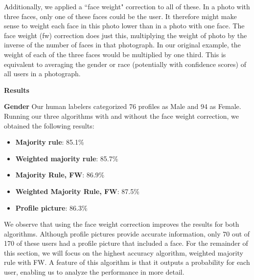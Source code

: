 Additionally, we applied a ``face weight" correction to all of these.
In a photo with three faces, only one of these faces could be the user.
It therefore might make sense to weight each face in this photo lower than in a photo with one face.
The face weight (fw) correction does just this, multiplying the weight of photo by the inverse of the number of faces in that photograph.
In our original example, the weight of each of the three faces would be multiplied by one third.
This is equivalent to averaging the gender or race (potentially with confidence scores) of all users in a photograph.


\textbf{Results}

\textbf{Gender}
Our human labelers categorized 76 profiles as Male and 94 as Female.
Running our three algorithms with and without the face weight correction, we obtained the following results:
\begin{itemize}
\item \textbf{Majority rule}: 85.1\%
\item \textbf{Weighted majority rule}: 85.7\%
\item \textbf{Majority Rule, FW}: 86.9\%
\item \textbf{Weighted Majority Rule, FW}: 87.5\%
\item \textbf{Profile picture}: 86.3\%
\end{itemize}

We observe that using the face weight correction improves the results for both algorithms.
Although profile pictures provide accurate information, only 70 out of 170 of these users had a profile picture that included a face.
For the remainder of this section, we will focus on the highest accuracy algorithm, weighted majority rule with FW.
A feature of this algorithm is that it outputs a probability for each user, enabling us to analyze the performance in more detail.

